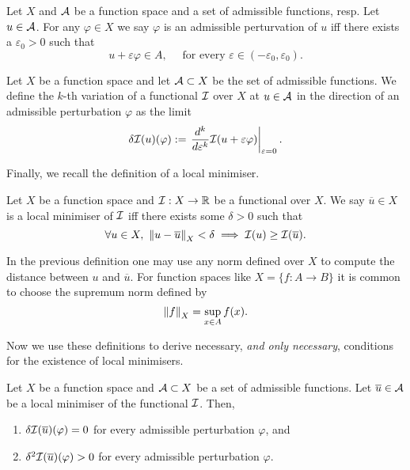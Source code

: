 \begin{dfn}

  Let $X$ and $\mathcal{A}$ be a function space and a set of admissible functions,
  resp. Let $u \in \mathcal{A}$. For any $\varphi \in X$ we say $\varphi$ is an
  admissible perturvation of $u$ iff there exists a $\varepsilon_0 > 0$ such
  that
  \[
    u + \varepsilon \varphi \in A,\quad \text{ for every } \varepsilon \in
    (-\varepsilon_0, \varepsilon_0).
  \]
\end{dfn}

\begin{dfn}
  [Variation]
  Let $X$ be a function space and let $\mathcal{A} \subset X$ be the set of
  admissible functions. We define the $k$-th variation of a functional $\mathcal{I}$
  over $X$ at $u \in \mathcal{A}$ in the direction of an admissible perturbation
  $\varphi$ as the limit
  \begin{equation}
    \label{eq:variation}
    \delta \mathcal{I} (u) (\varphi) := 
    \left. \frac{d^k}{d \varepsilon^k} \mathcal{I}(u + \varepsilon \varphi)\right|_{\varepsilon = 0}.
  \end{equation}
\end{dfn}

Finally, we recall the definition of a local minimiser.

\begin{dfn}

  Let $X$ be a function space and $\mathcal{I} : X \to \mathbb{R}$ be a functional over $X$.
  We say $\overline{u} \in X$ is a local minimiser of $\mathcal{I}$ iff there exists
  some $\delta > 0$ such that
  \[
    \forall u \in X,\ \left\Vert{u - \overline{u}}\right\Vert_X < \delta \implies
      \mathcal{I}(u) \geq \mathcal{I}(\overline{u}).
  \]
\end{dfn}

In the previous definition one may use any norm defined over $X$ to compute the
distance between $u$ and $\overline{u}$. For function spaces like $X = \{f : A
\to B\}$ it is common to choose the supremum norm defined by
\[
  \left\Vert{f}\right\Vert_X = \sup_{x \in A} f(x).
\]

Now we use these definitions to derive necessary, \textit{and only necessary},
conditions for the existence of local minimisers.

\begin{thm}
  \label{thm:cv-minimisers}

  Let $X$ be a function space and $\mathcal{A} \subset X$ be a set of admissible
  functions. Let $\overline{u} \in \mathcal{A}$ be a local minimiser of the
  functional $\mathcal{I}$. Then,
  \begin{enumerate}
    \item $\delta \mathcal{I}(\overline{u})(\varphi) = 0$ for every admissible
      perturbation $\varphi$, and
    \item $\delta^2 \mathcal{I}(\overline{u})(\varphi) > 0$ for every admissible
      perturbation $\varphi$.
  \end{enumerate}
\end{thm}

